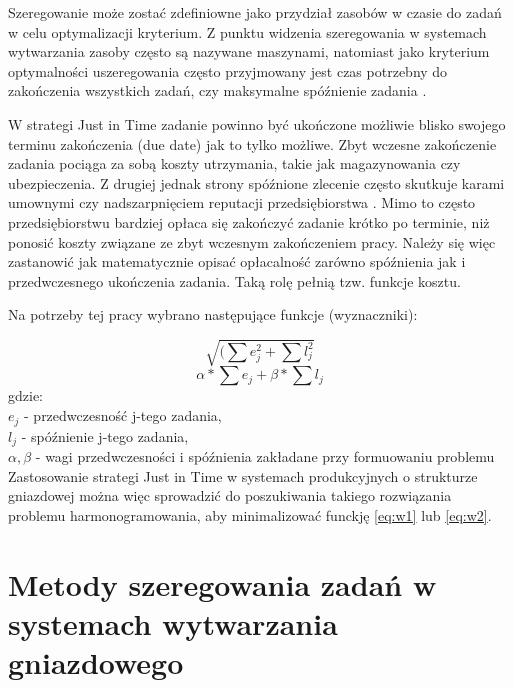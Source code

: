 \documentclass[twoside]{kInzynierka}
\begin{document}
Szeregowanie może zostać zdefiniowne jako przydział zasobów w czasie do zadań w celu optymalizacji kryterium. Z punktu widzenia szeregowania w systemach wytwarzania zasoby często są nazywane maszynami, natomiast jako kryterium optymalności uszeregowania często przyjmowany jest czas potrzebny do zakończenia wszystkich zadań, czy maksymalne spóźnienie zadania \cite{antColony}.

W strategi Just in Time zadanie powinno być ukończone możliwie blisko swojego terminu zakończenia (due date) jak to tylko możliwe. Zbyt wczesne zakończenie zadania pociąga za sobą koszty utrzymania, takie jak magazynowania czy ubezpieczenia. Z drugiej jednak strony spóźnione zlecenie często skutkuje karami umownymi czy nadszarpnięciem reputacji przedsiębiorstwa \cite{genetyczne} . Mimo to często przedsiębiorstwu bardziej opłaca się zakończyć zadanie krótko po terminie, niż ponosić koszty związane ze zbyt wczesnym zakończeniem pracy. Należy się więc zastanowić jak matematycznie opisać opłacalność zarówno spóźnienia jak i przedwczesnego ukończenia zadania. Taką rolę pełnią tzw. funkcje kosztu.

Na potrzeby tej pracy wybrano następujące funkcje (wyznaczniki):

\begin{equation}
    \sqrt{(\sum e_j^2 + \sum l_j^2}
    \label{eq:w1}
\end{equation}
\begin{equation}
    \alpha*\sum e_j + \beta*\sum l_j
    \label{eq:w2}
\end{equation}
gdzie: \\
\(e_j\) - przedwczesność j-tego zadania, \\
\(l_j\) - spóźnienie j-tego zadania, \\
\(\alpha, \beta\) - wagi przedwczesności i spóźnienia zakładane przy formuowaniu problemu\\

Zastosowanie strategi Just in Time w systemach produkcyjnych o strukturze gniazdowej można więc sprowadzić do poszukiwania takiego rozwiązania problemu harmonogramowania, aby minimalizować funckję \ref{eq:w1} lub \ref{eq:w2}.

\section       [Metody szeregowania zadań \ldots]
		        {Metody szeregowania zadań \newline w systemach wytwarzania gniazdowego}
\end{document}
